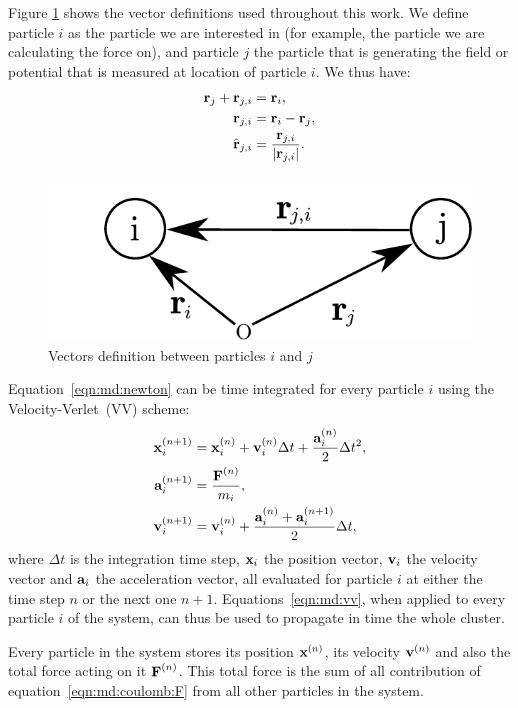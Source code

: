 Figure
\ref{fig:md:vectors} shows the vector definitions used throughout this work. We
define particle $i$ as the particle we are interested in (for example, the
particle we are calculating the force on), and particle $j$ the particle that
is generating the field or potential that is measured at location of particle
$i$. We thus have:
\begin{align}
\textbf{r}_{j} + \textbf{r}_{j,i} & = \textbf{r}_{i}, \\
\textbf{r}_{j,i} & = \textbf{r}_{i} - \textbf{r}_{j}, \\
\hat{\textbf{r}}_{j,i} & = \frac{\textbf{r}_{j,i}}{\left| \textbf{r}_{j,i} \right|}.
\end{align}
%
\begin{figure}
 \centering
 \includegraphics[width=0.5\columnwidth]{figures/vectors}
 \caption{\label{fig:md:vectors}Vectors definition between particles $i$ and $j$}
\end{figure}
%
%
Equation~\eqref{eqn:md:newton} can be time integrated for every particle
$i$ using the Velocity-Verlet~(VV) scheme:
\begin{subequations}
\label{eqn:md:vv}
\begin{align}
\textbf{x}_{i}^{\left( n+1 \right)} & = \textbf{x}_{i}^{\left( n \right)} + \textbf{v}_{i}^{\left( n \right)} \Delta t +
\frac{\textbf{a}_{i}^{\left( n \right)}}{2} \Delta t^2, \\
\textbf{a}_{i}^{\left( n+1 \right)} & = \frac{\textbf{F}^{\left( n \right)}}{m_i}, \label{eqn:md:vv:a} \\
\textbf{v}_{i}^{\left( n+1 \right)} & = \textbf{v}_{i}^{\left( n \right)} + \frac{\textbf{a}_{i}^{\left( n \right)} +
\textbf{a}_{i}^{\left( n+1 \right)}}{2} \Delta t,
\end{align}
\end{subequations}
where $\Delta t$ is the integration time step, $\textbf{x}_{i}$ the position vector,
$\textbf{v}_{i}$ the velocity vector and $\textbf{a}_{i}$ the acceleration vector, all evaluated
for particle $i$ at either the time step $n$ or the next one $n+1$.
Equations~\eqref{eqn:md:vv}, when applied to every particle $i$ of the system,
can thus be used to propagate in time the whole cluster.

Every particle in the system stores its position $\textbf{x}^{\left( n \right)}$, its velocity
$\textbf{v}^{\left( n \right)}$ and also the total force acting on it $\textbf{F}^{\left( n \right)}$. This total
force is the sum of all contribution of equation~\eqref{eqn:md:coulomb:F} from
all other particles in the system.

